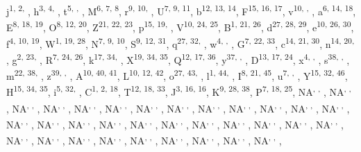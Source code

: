 \documentclass{article}\usepackage[]{graphicx}\usepackage[]{color}
\begin{document}
j\textsuperscript{1, 2, },
h\textsuperscript{3, 4, },
t\textsuperscript{5, , },
M\textsuperscript{6, 7, 8},
r\textsuperscript{9, 10, },
U\textsuperscript{7, 9, 11},
b\textsuperscript{12, 13, 14},
F\textsuperscript{15, 16, 17},
v\textsuperscript{10, , },
a\textsuperscript{6, 14, 18},
E\textsuperscript{8, 18, 19},
O\textsuperscript{8, 12, 20},
Z\textsuperscript{21, 22, 23},
p\textsuperscript{15, 19, },
V\textsuperscript{10, 24, 25},
B\textsuperscript{1, 21, 26},
d\textsuperscript{27, 28, 29},
e\textsuperscript{10, 26, 30},
f\textsuperscript{4, 10, 19},
W\textsuperscript{1, 19, 28},
N\textsuperscript{7, 9, 10},
S\textsuperscript{9, 12, 31},
q\textsuperscript{27, 32, },
w\textsuperscript{4, , },
G\textsuperscript{7, 22, 33},
c\textsuperscript{14, 21, 30},
n\textsuperscript{14, 20, },
g\textsuperscript{2, 23, },
R\textsuperscript{7, 24, 26},
k\textsuperscript{17, 34, },
X\textsuperscript{19, 34, 35},
Q\textsuperscript{12, 17, 36},
y\textsuperscript{37, , },
D\textsuperscript{13, 17, 24},
x\textsuperscript{4, , },
s\textsuperscript{38, , },
m\textsuperscript{22, 38, },
z\textsuperscript{39, , },
A\textsuperscript{10, 40, 41},
L\textsuperscript{10, 12, 42},
o\textsuperscript{27, 43, },
l\textsuperscript{1, 44, },
I\textsuperscript{8, 21, 45},
u\textsuperscript{7, , },
Y\textsuperscript{15, 32, 46},
H\textsuperscript{15, 34, 35},
i\textsuperscript{5, 32, },
C\textsuperscript{1, 2, 18},
T\textsuperscript{12, 18, 33},
J\textsuperscript{3, 16, 16},
K\textsuperscript{9, 28, 38},
P\textsuperscript{7, 18, 25},
NA\textsuperscript{, , },
NA\textsuperscript{, , },
NA\textsuperscript{, , },
NA\textsuperscript{, , },
NA\textsuperscript{, , },
NA\textsuperscript{, , },
NA\textsuperscript{, , },
NA\textsuperscript{, , },
NA\textsuperscript{, , },
NA\textsuperscript{, , },
NA\textsuperscript{, , },
NA\textsuperscript{, , },
NA\textsuperscript{, , },
NA\textsuperscript{, , },
NA\textsuperscript{, , },
NA\textsuperscript{, , },
NA\textsuperscript{, , },
NA\textsuperscript{, , },
NA\textsuperscript{, , },
NA\textsuperscript{, , },
NA\textsuperscript{, , },
NA\textsuperscript{, , },
NA\textsuperscript{, , },
NA\textsuperscript{, , },
NA\textsuperscript{, , },
NA\textsuperscript{, , },
NA\textsuperscript{, , },
NA\textsuperscript{, , },
NA\textsuperscript{, , },
NA\textsuperscript{, , },
NA\textsuperscript{, , },
NA\textsuperscript{, , },
NA\textsuperscript{, , },
\end{document}
